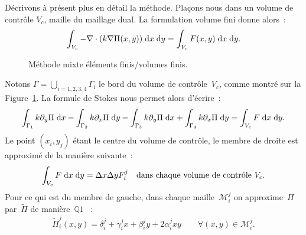 \documentclass[main.tex]{subfiles}
\begin{document}
Décrivons à présent plus en détail la méthode. 
Plaçons nous dans un volume de contrôle $V_c$, maille du maillage dual.  La formulation volume fini donne alors~:
\begin{equation}
\int_{V_c} -\nabla\cdot ( k \nabla \Pi(x,y) ) \;{\rm d}x\;{\rm d}y = \int_{V_c}F(x,y) \;{\rm d}x\;{\rm d}y.
\end{equation}
\begin{figure}
\centering
\resizebox{.7\textwidth}{!}{}
\caption{\label{fig:methode_mixte_EFVF}Méthode mixte éléments finis/volumes finis.}
\end{figure}
Notons $\Gamma=\displaystyle \bigcup_{i=1,2,3,4} \Gamma_i$ le bord du volume de contrôle~$V_c$, comme montré sur la Figure~\ref{fig:methode_mixte_EFVF}. La formule de Stokes nous permet alors d'écrire~:
\begin{equation}
\int_{\Gamma_1}k \partial_y \Pi \;{\rm d}x - \int_{\Gamma_2}k \partial_x \Pi \;{\rm d}y - \int_{\Gamma_3}k \partial_y \Pi \;{\rm d}x + \int_{\Gamma_4}k \partial_x \Pi \;{\rm d}y = \int_{V_c}F \;{\rm d}x \;{\rm d}y.
\end{equation}
Le point $(x_i,y_j)$ étant le centre du volume de contrôle, le membre de droite est approximé de la manière suivante~:
\begin{equation}
\int_{V_c}F \;{\rm d}x \;{\rm d}y = \Delta x \Delta y F_i^j \quad \textrm{dans chaque volume de contrôle~} V_c.
\end{equation}
Pour ce qui est du membre de gauche, dans chaque maille~$\mathcal{M}_i^j$ on approxime~$\Pi$ par~$\tilde{\Pi}$ de manière~$\mathds{Q}1$ \ie~:
\begin{equation}\label{eq:anx_form_var_pr_eq_poisson}
\tilde{\Pi}_i^j(x,y) = \delta_i^j + \gamma_i^jx + \beta_i^jy + 2\alpha_i^jxy  \qquad \forall (x,y) \in \mathcal{M}_i^j.
\end{equation}
\end{document}
